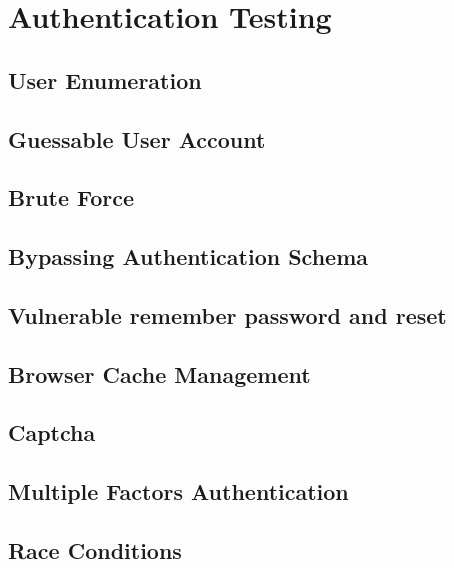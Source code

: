 \chapter{Authentication Testing}

\section{User Enumeration}

\section{Guessable User Account}

\section{Brute Force}

\section{Bypassing Authentication Schema}

\section{Vulnerable remember password and reset}

\section{Browser Cache Management}

\section{Captcha}

\section{Multiple Factors Authentication}

\section{Race Conditions}

